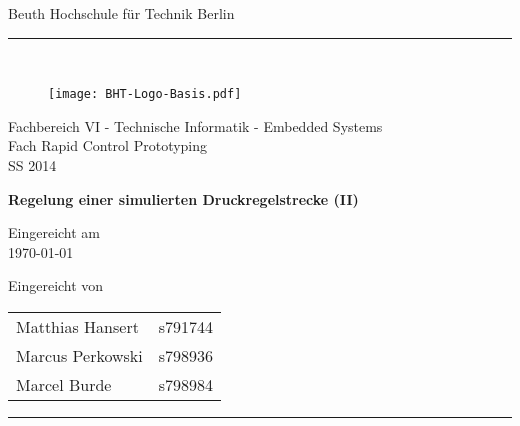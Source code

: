 

\begin{titlepage}
	\begin{center}
		\Large
		Beuth Hochschule für Technik Berlin
		\textcolor{darkBHT}{\rule{\textwidth}{0.2cm}} \\
		\vspace{2 cm}
		
		
		\begin{figure}[htbp]
			\centering 
			\texttt{[image: BHT-Logo-Basis.pdf]}  
		\end{figure}
		
		\vspace{1cm}
		
		\Large
		Fachbereich VI - Technische Informatik - Embedded Systems\\
		Fach Rapid Control Prototyping\\
		SS 2014\\
		\vspace{2 cm}
		
		\Huge
		\textbf{Regelung einer simulierten Druckregelstrecke (II)}
		\vspace{2 cm}
	
		\Large
		Eingereicht am \\
		\today %
		\vspace{0.8cm}
		
		Eingereicht von \\
		\begin{tabular}{ll}
			Matthias Hansert & s791744\\
			Marcus Perkowski & s798936\\
			Marcel Burde & s798984\\
		\end{tabular}

	\end{center}
	\vfill
	\textcolor{darkBHT}{\rule{\textwidth}{0.2cm}}
	\vspace{1 cm}
	\normalsize
	
\end{titlepage}

%
%